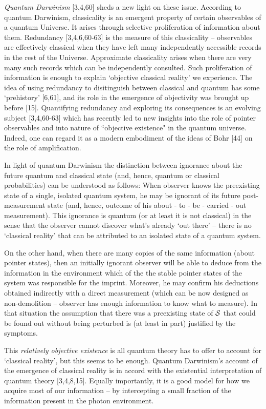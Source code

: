 \documentclass[aps,twocolumn,pra,epsfig]{revtex4}
\begin{document}
{\it Quantum Darwinism} [3,4,60] sheds a new light on these issue. According to
quantum Darwinism, classicality is an emergent property of certain observables
of a quantum Universe. It arises through selective proliferation of information
about them. Redundancy [3,4,6,60-63] is the measure of this classicality
-- observables are effectively classical when they have left many independently
accessible records in the rest of the Universe.  Approximate classicality 
arises when there are very many such records which can be independently
consulted. Such proliferation of information is enough to explain 
`objective classical reality' we experience. The idea of using redundancy 
to disitinguish between classical and quantum has some `prehistory' [6,61], and 
its role in the emergence of objectivity was brought up before [15]. Quantifying 
redundancy and exploring its consequences is an evolving subject
[3,4,60-63] which has recently led to new insights into the role of pointer
observables and into nature of ``objective existence" in the quantum universe.
Indeed, one can regard it as a modern embodiment of the ideas of Bohr [44] on
the role of amplification.

In light of quantum Darwinism the distinction between ignorance
about the future quantum and classical state (and, hence, quantum or classical
probabilities) can be understood as follows: When observer knows the 
preexisting state of a single, isolated quantum system, he may be ignorant of 
its future post-measurement state (and, hence, outcome of his about - to - be 
- carried - out measurement). This ignorance is quantum (or at least it is not classical) 
in the sense that the observer cannot discover what's already `out there' -- there is no 
`classical reality' that can be attributed to an isolated state of a quantum system. 

On the other hand, when there are many copies of the same information 
(about pointer states), then an initially ignorant observer will be able to 
deduce from the information in the environment which of the the stable 
pointer states of the system was responsible for the imprint. Moreover, he may
confirm his deductions obtained indirectly with a direct measurement (which can
be now designed as non-demolition -- observer has enough information to know
what to measure). In that situation the assumption that there was a preexisting
state of ${\cal S}$ that could be found out without being perturbed is (at least
in part) justified by the symptoms. 

This {\it relatively objective existence}
is all quantum theory has to offer to account for `classical reality', but this
seems to be enough. Quantum Darwinism's account of the emergence of classical
reality is in accord with the existential interpretation of quantum theory
[3,4,8,15]. Equally importantly, it is a good model for how we acquire most of
our information -- by intercepting a small fraction of the information present
in the photon environment. 
\end{document}
